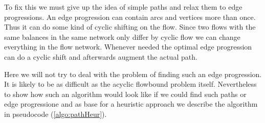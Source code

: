 To fix this we must give up the idea of simple paths and relax them to edge progressions. An edge progression can 
contain arcs and vertices more than once. Thus it can do some kind of cyclic shifting on the flow. Since two flows with 
the same balances in the same network only differ by cyclic flow we can change everything in the flow network. 
Whenever needed the optimal edge progression can do a cyclic shift and afterwards augment the actual path. 

Here we will not try to deal with the problem of finding such an edge progression. It is likely to be as 
difficult as the acyclic flowbound problem itself. Nevertheless to show how such an algorithm would look like if we 
could find such paths or edge progressione and as base for a heuristic approach we describe the algorithm 
in pseudocode (\ref{algo:pathHeur}).

% 
% 
% 

